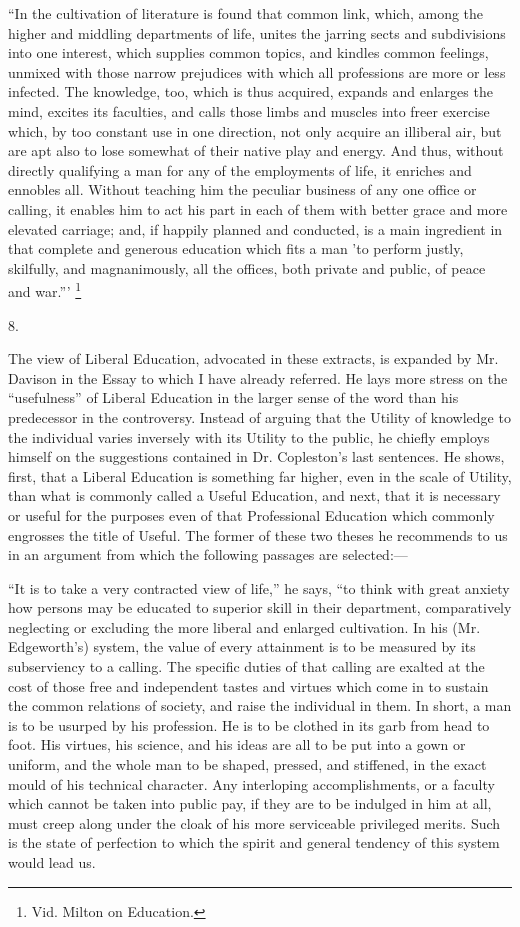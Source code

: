 ``In the cultivation of literature is found that common link,
which, among the higher and middling departments of life, unites the
jarring sects and subdivisions into one interest, which supplies
common topics, and kindles common feelings, unmixed with those narrow
prejudices with which all professions are more or less infected. The
knowledge, too, which is thus acquired, expands and enlarges the mind,
excites its faculties, and calls those limbs and muscles into freer
exercise which, by too constant use in one direction, not only acquire
an illiberal air, but are apt also to lose somewhat of their native
play and energy. And thus, without directly qualifying a man for any
of the employments of life, it enriches and ennobles all. Without
teaching him the peculiar business of any one office or calling, it
enables him to act his part in each of them with better grace and more
elevated carriage; and, if happily planned and conducted, is a main
ingredient in that complete and generous education which fits a man
'to perform justly, skilfully, and magnanimously, all the offices,
both private and public, of peace and war.''' \footnote{Vid. Milton on
Education.}

8.

The view of Liberal Education, advocated in these extracts, is
expanded by Mr. Davison in the Essay to which I have already referred.
He lays more stress on the ``usefulness'' of Liberal
Education in the larger sense of the word than his predecessor in the
controversy. Instead of arguing that the Utility of knowledge to the
individual varies inversely with its Utility to the public, he chiefly
employs himself on the suggestions contained in Dr. Copleston's last
sentences. He shows, first, that a Liberal Education is something far
higher, even in the scale of Utility, than what is commonly called a
Useful Education, and next, that it is necessary or useful for the
purposes even of that Professional Education which commonly engrosses
the title of Useful. The former of these two theses he recommends to
us in an argument from which the following passages are selected:—

``It is to take a very contracted view of life,'' he says,
``to think with great anxiety how persons may be educated to
superior skill in their department, comparatively neglecting or
excluding the more liberal and enlarged cultivation. In his (Mr.
Edgeworth's) system, the value of every attainment is to be measured
by its subserviency to a calling. The specific duties of that calling
are exalted at the cost of those free and independent tastes and
virtues which come in to sustain the common relations of society, and
raise the individual in them. In short, a man is to be usurped by his
profession. He is to be clothed in its garb from head to foot. His
virtues, his science, and his ideas are all to be put into a gown or
uniform, and the whole man to be shaped, pressed, and stiffened, in
the exact mould of his technical character. Any interloping
accomplishments, or a faculty which cannot be taken into public pay,
if they are to be indulged in him at all, must creep along under the
cloak of his more serviceable privileged merits. Such is the state of
perfection to which the spirit and general tendency of this system
would lead us.

